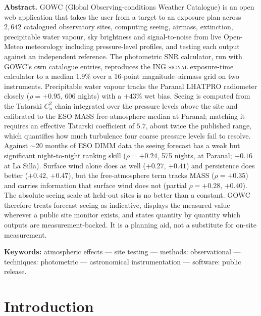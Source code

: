 \documentclass[11pt]{article}
\begin{document}
\begin{center}
\begin{minipage}{0.9\textwidth}
{\small
\textbf{Abstract.} GOWC (Global Observing-conditions Weather Catalogue) is an open web
application that takes the user from a target to an exposure plan across $2{,}642$
catalogued observatory sites, computing seeing, airmass, extinction, precipitable
water vapour, sky brightness and signal-to-noise from live Open-Meteo meteorology
including pressure-level profiles, and testing each output against an independent
reference. The photometric SNR calculator, run with GOWC's own catalogue entries,
reproduces the ING \textsc{signal} exposure-time calculator to a median $1.9\%$ over a
16-point magnitude--airmass grid on two instruments. Precipitable water vapour tracks
the Paranal LHATPRO radiometer closely ($\rho=+0.95$, 606 nights) with a $+43\%$ wet
bias. Seeing is computed from the Tatarski $C_n^2$ chain integrated over the pressure
levels above the site and calibrated to the ESO MASS free-atmosphere median at
Paranal; matching it requires an effective Tatarski coefficient of $5.7$, about twice
the published range, which quantifies how much turbulence four coarse pressure levels
fail to resolve. Against $\sim$20 months of ESO DIMM data the seeing forecast has a
weak but significant night-to-night ranking skill ($\rho=+0.24$, 575 nights, at
Paranal; $+0.16$ at La Silla). Surface wind alone does as well ($+0.27$, $+0.41$) and
persistence does better ($+0.42$, $+0.47$), but the free-atmosphere term tracks MASS
($\rho=+0.35$) and carries information that surface wind does not (partial
$\rho=+0.28$, $+0.40$). The absolute seeing scale at held-out sites is no better than
a constant. GOWC therefore treats forecast seeing as indicative, displays the measured
value wherever a public site monitor exists, and states quantity by quantity which
outputs are measurement-backed. It is a planning aid, not a substitute for on-site
measurement.

\vspace{4pt}
\noindent\textbf{Keywords:} atmospheric effects --- site testing --- methods:
observational --- techniques: photometric --- astronomical instrumentation ---
software: public release.
}
\end{minipage}
\end{center}

\vspace{6pt}

\section{Introduction}
\end{document}
